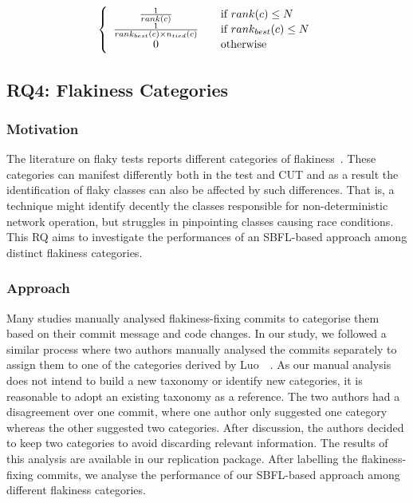 \vspace{-4mm}
\[
\left\{ 
  \begin{array}{ c l }
    \frac{1}{rank(c)} & \quad \textrm{if } rank(c) \leq N \\
    \frac{1}{rank_{best}(c) \times n_{tied}(c)} & \quad \textrm{if } rank_{best}(c) \leq N \\
    0                 & \quad \textrm{otherwise}
  \end{array}
\right.
\]

\subsection{RQ4: Flakiness Categories}
\subsubsection{Motivation}
The literature on flaky tests reports different categories of flakiness~\cite{Luo2014,Parry2021,Lam2020a,Gruber2021}.
These categories can manifest differently both in the test and CUT and as a result the identification of flaky classes can also be affected by such differences.
That is, a technique might identify decently the classes responsible for non-deterministic network operation, but struggles in pinpointing classes causing race conditions.
This RQ aims to investigate the performances of an SBFL-based approach among distinct flakiness categories.

\subsubsection{Approach}
Many studies manually analysed flakiness-fixing commits to categorise them~\cite{Luo2014,Thorve2018} based on their commit message and code changes.
In our study, we followed a similar process where two authors manually analysed the commits separately to assign them to one of the categories derived by Luo~\etal~\cite{Luo2014}.
As our manual analysis does not intend to build a new taxonomy or identify new categories, it is reasonable to adopt an existing taxonomy as a reference.
The two authors had a disagreement over one commit, where one author only suggested one category whereas the other suggested two categories.
After discussion, the authors decided to keep two categories to avoid discarding relevant information.
The results of this analysis are available in our replication package.
After labelling the flakiness-fixing commits, we analyse the performance of our SBFL-based approach among different flakiness categories. 


